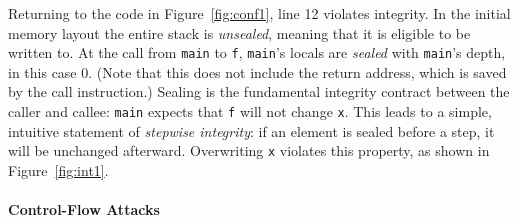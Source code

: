 \documentclass[10pt,conference]{ieeetran}%
\theoremstyle{definition}
\begin{document}
Returning to the code in Figure~\ref{fig:conf1}, line 12 violates integrity.
In the initial memory layout the entire stack is {\em unsealed},
meaning that it is eligible to be written to. At the call from {\tt main} to
{\tt f}, {\tt main}'s locals are {\em sealed} with {\tt main}'s depth,
in this case 0. (Note that this does not include the return address, which is saved
by the call instruction.)
Sealing is the fundamental integrity contract between the caller and callee:
{\tt main} expects that {\tt f} will not change {\tt x}.
This leads to a simple, intuitive statement of {\em stepwise integrity}:
if an element is sealed before a step, it will be unchanged afterward.
Overwriting {\tt x} violates this property, as shown in Figure~\ref{fig:int1}.

\paragraph*{Control-Flow Attacks}
\end{document}
